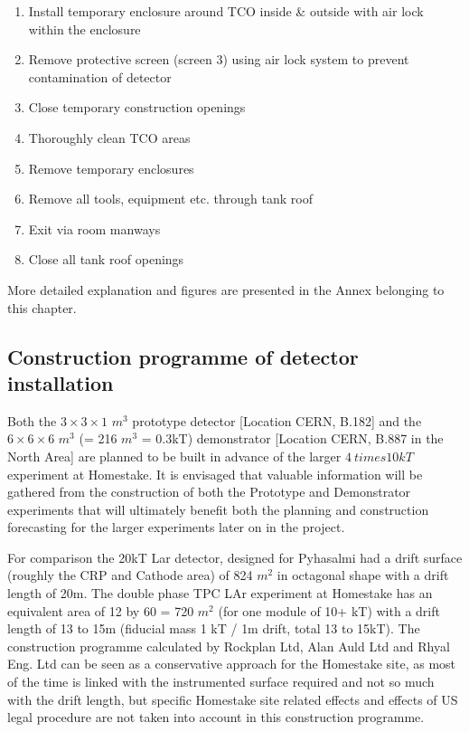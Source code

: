 \begin{enumerate}
\item{Install temporary enclosure around TCO inside \& outside with air lock within the enclosure}
\item{ Remove protective screen (screen 3) using air lock system to prevent contamination of detector}
\item{Close temporary construction openings}
\item{Thoroughly clean TCO areas}
\item{Remove temporary enclosures}
\item{Remove all tools, equipment etc. through tank roof}
\item{Exit via room manways}
\item{Close all tank roof openings}
\end{enumerate}

More detailed explanation and figures are presented in the Annex belonging to this chapter.

\subsection{Construction programme of detector installation}
Both the $3\times3\times1$ $m^3$ prototype detector [Location CERN, B.182] and the $6\times 6\times 6$ $m^3$  (= 216 $m^3$ = 0.3kT) demonstrator [Location CERN, B.887 in the North Area] are planned to be built in advance of the larger $4\ times 10kT$ experiment at Homestake.  It is envisaged that valuable information will be gathered from the construction of both the Prototype and Demonstrator experiments that will ultimately benefit both the planning and construction forecasting for the larger experiments later on in the project.

For comparison the 20kT Lar detector, designed for Pyhasalmi had a drift surface (roughly the CRP and Cathode area) of 824 $m^2$ in octagonal shape with a drift length of 20m. The double phase TPC LAr experiment at Homestake has an equivalent area of 12 by 60 = 720 $m^2$ (for one module of 10+ kT) with a drift length of 13 to 15m (fiducial mass 1 kT / 1m drift, total 13 to 15kT). The construction programme calculated by Rockplan Ltd, Alan Auld Ltd and Rhyal Eng. Ltd can be seen as a conservative approach for the Homestake site, as most of the time is linked with the instrumented surface required and not so much with the drift length, but specific Homestake site related effects and effects of US legal procedure are not taken into account in this construction programme.

